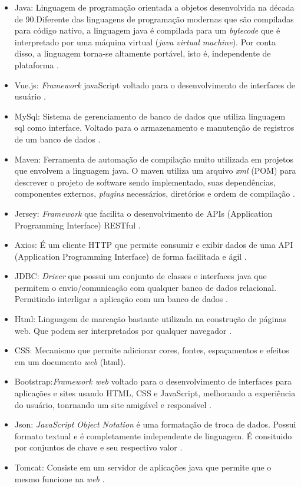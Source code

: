 \begin{itemize}
	\item Java: Linguagem de programação orientada a objetos desenvolvida na década de 90.Diferente das linguagens de programação
		modernas que são compiladas para código nativo, a linguagem java é compilada para um \textit{bytecode} que é interpretado por uma máquina
		virtual (\textit{java virtual machine}). Por conta disso, a linguagem torna-se altamente portável, isto é, independente de plataforma \cite{java}.
	\item Vue.js: \textit{Framework} javaScript voltado para o desenvolvimento de interfaces de usuário \cite{vue}.
	\item MySql: Sistema de gerenciamento de banco de dados que utiliza linguagem sql como interface. Voltado para o armazenamento e manutenção 
		de registros de um banco de dados \cite{mysql}.
	\item Maven: Ferramenta de automação de compilação muito utilizada em projetos que envolvem a linguagem java. O maven
		utiliza um arquivo \textit{xml} (POM) para descrever o projeto de software sendo implementado, suas dependências, componentes
		externos, \textit{plugins} necessários, diretórios e ordem de compilação \cite{maven}.
	\item Jersey: \textit{Framework} que facilita o desenvolvimento de APIs (Application Programming Interface) RESTful \cite{jersey}.
	\item Axios: É um cliente HTTP que permite consumir e exibir dados de uma API (Application Programming Interface) de forma facilitada e ágil \cite{axios}.
	\item JDBC: \textit{Driver} que possui um conjunto de classes e interfaces java que permitem o envio/comunicação com qualquer
		banco de dados relacional. Permitindo interligar a aplicação com um banco de dados \cite{jdbc}.
	\item Html: Linguagem de marcação bastante utilizada na construção de páginas web. Que podem ser interpretados por 
		qualquer navegador \cite{html}.
	\item CSS: Mecanismo que permite adicionar cores, fontes, espaçamentos e efeitos em um documento \textit{web} (html). \cite{css}
	\item Bootstrap:\textit{Framework web} voltado para o desenvolvimento de interfaces para aplicações e sites usando HTML, CSS e JavaScript, melhorando
		a experiência do usuário, tonrnando um site amigável e responsível \cite{bootstrap}.
	\item Json: \textit{JavaScript Object Notation} é uma formatação de troca de dados. Possui formato textual e é completamente independente de linguagem. É
		consituido por conjuntos de chave e seu respectivo valor \cite{json}.
	\item Tomcat: Consiste em um servidor de aplicações java que permite que o mesmo funcione na \textit{web} \cite{tomcat}.

\end{itemize}

